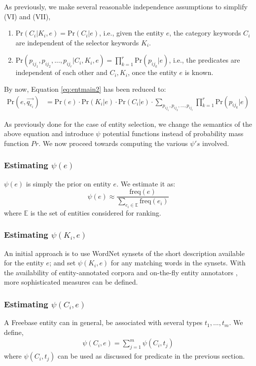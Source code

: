 \documentclass[a4paper, twoside, 12pt]{report}
\begin{document}
As previously, we make several reasonable independence assumptions to simplify (VI) and (VII),
\begin{enumerate}
\item $\text{Pr}(C_i|K_i,e) = \text{Pr}(C_i|e)$, i.e., given the entity $e$, the category keywords $C_i$ are independent of the selector keywords $K_i$.

\item $\text{Pr}(p_{ij_1}, p_{ij_2},..., p_{ij_r} | C_i, K_i, e) = \prod_{k=1}^{r} \text{Pr}(p_{ij_k} | e)$, i.e., the predicates are independent of each other and $C_i, K_i$, once the entity $e$ is known.
\end{enumerate}

By now, Equation \ref{eq:entmain2} has been reduced to:
\begin{align}
\text{Pr}(e, \vec{q_{e_i}}) &= \text{Pr}(e) \cdot \text{Pr}(K_i | e) \cdot \text{Pr}(C_i | e) \cdot \sum_{p_{ij_1}, p_{ij_2},..., p_{ij_r}}  \prod_{k=1}^{r} \text{Pr}(p_{ij_k} | e) \label{eq:entmain3}
\end{align}

As previously done for the case of entity selection, we change the semantics of the above equation and introduce $\psi$ potential functions instead of probability mass function $Pr$. We now proceed towards computing the various $\psi's$ involved.

\subsubsection{Estimating $\psi(e)$}
$\psi(e)$ is simply the prior on entity $e$. We estimate it as:
$$\psi(e) \approx \frac{\text{freq}(e)}{\sum_{e_i \in \mathbb{E}}\text{freq}(e_i)}$$
where $\mathbb{E}$ is the set of entities considered for ranking. 

\subsubsection{Estimating $\psi(K_i, e)$}
An initial approach is to use WordNet synsets of the short description available for the entity $e$; and set $\psi(K_i, e)$ for any matching words in the synsets. With the availability of entity-annotated corpora and on-the-fly entity annotators \cite{ferragina2010tagme}, more sophisticated measures can be defined.

\subsubsection{Estimating $\psi(C_i, e)$}
A Freebase entity can in general, be associated with several types $t_1, ..., t_m$. We define, 
\begin{align}
 \psi(C_i, e) = \sum_{j=1}^{m} \psi(C_i, t_j)
\end{align}
where $\psi(C_i, t_j)$ can be used as discussed for predicate in the previous section.
\end{document}
